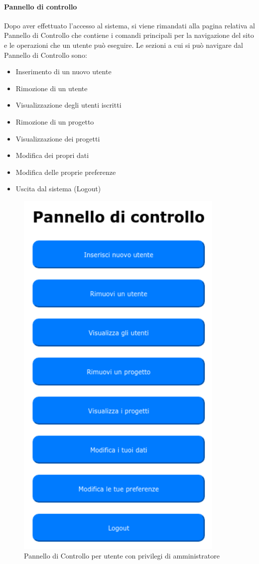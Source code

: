 \paragraph{Pannello di controllo}
Dopo aver effettuato l'accesso al sistema, si viene rimandati alla pagina relativa al Pannello di Controllo che contiene i comandi principali per la navigazione del sito e le operazioni che un utente può eseguire.
Le sezioni a cui si può navigare dal Pannello di Controllo sono:
\begin{itemize}
    \item Inserimento di un nuovo utente
    \item Rimozione di un utente
    \item Visualizzazione degli utenti iscritti
    \item Rimozione di un progetto
    \item Visualizzazione dei progetti
    \item Modifica dei propri dati
    \item Modifica delle proprie preferenze
	\item Uscita dal sistema (Logout)
\end{itemize}
\begin{figure}[H]
    \centering
    \includegraphics[width=10cm]{img/admin_panel_1.png}
    \caption{Pannello di Controllo per utente con privilegi di amministratore}
\end{figure}

